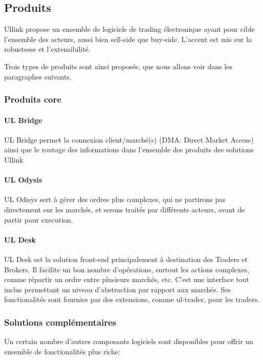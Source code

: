 \documentclass[a4paper, 11pt]{article}
\begin{document}
\subsection{Produits}

Ullink propose un ensemble de logiciels de trading électronique ayant pour cible l'ensemble des acteurs, aussi bien sell-side que buy-side. L'accent est mis sur la robustesse et l'extensibilité.

Trois types de produits sont ainsi proposés, que nous allons voir dans les paragraphes suivants.

\subsubsection{Produits core}

\paragraph{UL Bridge}

UL Bridge permet la connexion client/marché(s) (DMA: Direct Market Access) ainsi que le routage des informations dans l'ensemble des produits des solutions Ullink

\paragraph{UL Odysis}

UL Odisys sert à gérer des ordres plus complexes, qui ne partirons pas directement sur les marchés, et serons traités par différents acteurs, avant de partir pour execution.

\paragraph{UL Desk}
UL Desk est la solution front-end principalement à destination des Traders et Brokers. Il facilite un bon nombre d'opérations, surtout les actions complexes, comme répartir un ordre entre plusieurs marchés, etc. C'est une interface tout inclus permettant un niveau d'abstraction par rapport aux marchés. Ses fonctionalités sont fournies par des extensions, comme ul-trader, pour les traders.

\subsubsection{Solutions complémentaires}
Un certain nombre d'autres composants logiciels sont disponibles pour offrir un ensemble de fonctionalités plus riche:
\end{document}
